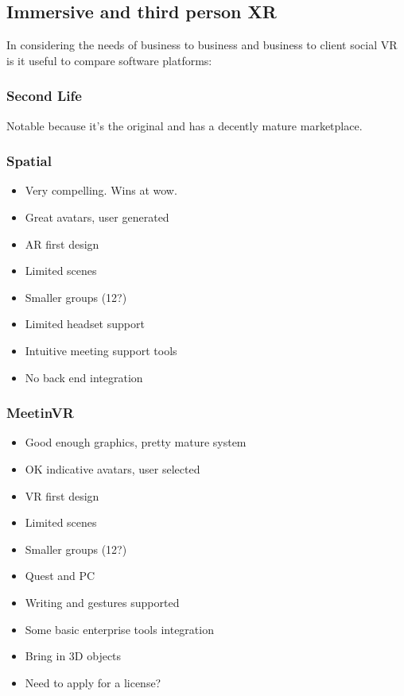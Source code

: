 \subsection{Immersive and third person XR}
In considering the needs of business to business and business to client social VR is it useful to compare software platforms:
\subsubsection{Second Life}
Notable because it's the original and has a decently mature marketplace.
\subsubsection{Spatial}
\begin{itemize}
\item Very compelling. Wins at wow.
\item Great avatars, user generated
\item AR first design
\item Limited scenes
\item Smaller groups (12?)
\item Limited headset support
\item Intuitive meeting support tools
\item No back end integration
\end{itemize}
\subsubsection{MeetinVR}
\begin{itemize}
\item Good enough graphics, pretty mature system
\item OK indicative avatars, user selected
\item VR first design
\item Limited scenes
\item Smaller groups (12?)
\item Quest and PC
\item Writing and gestures supported
\item Some basic enterprise tools integration
\item Bring in 3D objects
\item Need to apply for a license?
\end{itemize}
